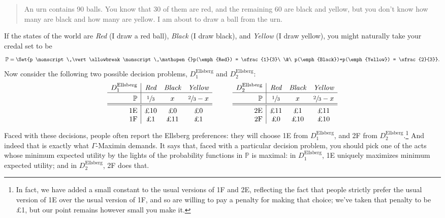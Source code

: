 \documentclass[a4paper]{article}
\newcommand\Tstrut{\rule{0pt}{2.6ex}}       %
\newcommand\Bstrut{\rule[-0.9ex]{0pt}{0pt}} %
\renewcommand\P{\mathbb{P}} %
\newcommand{\IP}{\P}
\newcommand\SetDelimiter[1][]{
	\nonscript\,#1\vert \allowbreak \nonscript\,\mathopen{}}
\providecommand\given{\SetDelimiter}
\newenvironment{CCM rewritten}
{\begingroup\color{blue}} %
{\endgroup}              %
\begin{document}
\label{sect:Ellsberg}
\begin{quote}
 An urn contains 90 balls. You know that 30 of them are red, and the remaining 60 are black and yellow, but you don’t know how many are black and how many are yellow. I am about to draw a ball from the urn.
\end{quote}
If the states of the world are \emph{Red} (I draw a red ball), \emph{Black} (I draw black), and \emph{Yellow} (I draw yellow), you might naturally take your credal set to be $$\IP = \Set{p \given p(\emph{Red}) = \sfrac{1}{3}\ \&\ p(\emph{Black})+p(\emph{Yellow}) = \sfrac{2}{3}}.$$
Now consider the following two possible decision problems, $D^{\mathrm{Ellsberg}}_1$ and $D^{\mathrm{Ellsberg}}_2$:
$$
\begin{array}{r|ccc}
D^{\mathrm{Ellsberg}}_1 & \emph{Red} & \emph{Black} &\emph{Yellow} \Bstrut \\\hline \Tstrut\IP & \sfrac{1}{3} & x&\sfrac{2}{3}-x %
\Bstrut \\\hline \hline\Tstrut 
\text{1E} & \text{\pounds 10} & \text{\pounds 0}  & \text{\pounds 0} \\
\text{1F} & \text{\pounds 1} & \text{\pounds 11}  & \text{\pounds 1} 
\end{array}
\hspace{10mm}
\begin{array}{r|ccc}
D^{\mathrm{Ellsberg}}_2 & \emph{Red} & \emph{Black} &\emph{Yellow} \Bstrut \\\hline \Tstrut\IP & \sfrac{1}{3} &x&\sfrac{2}{3}-x %
\Bstrut \\\hline \hline\Tstrut 
\text{2E} & \text{\pounds 11} & \text{\pounds 1}  & \text{\pounds 11} \\
\text{2F} & \text{\pounds 0} & \text{\pounds 10}  & \text{\pounds 10} 
\end{array}
$$
Faced with these decisions, people often report the Ellsberg preferences: they will choose 1E from $D^{\mathrm{Ellsberg}}_1$, and 2F from $D^{\mathrm{Ellsberg}}_2$.\footnote{In fact, we have added a small constant to the usual versions of 1F and 2E, reflecting the fact that people strictly prefer the usual version of 1E over the usual version of 1F, and so are willing to pay a penalty for making that choice; we've taken that penalty to be \pounds 1, but our point remains however small you make it.} And indeed that is exactly what $\Gamma$-Maximin demands. It says that, faced with a particular decision problem, you should pick one of the acts whose minimum expected utility by the lights of the probability functions in $\IP$ is maximal: in $D^{\mathrm{Ellsberg}}_1$, 1E uniquely maximizes minimum expected utility; and in $D^{\mathrm{Ellsberg}}_2$, 2F does that.
\end{document}
